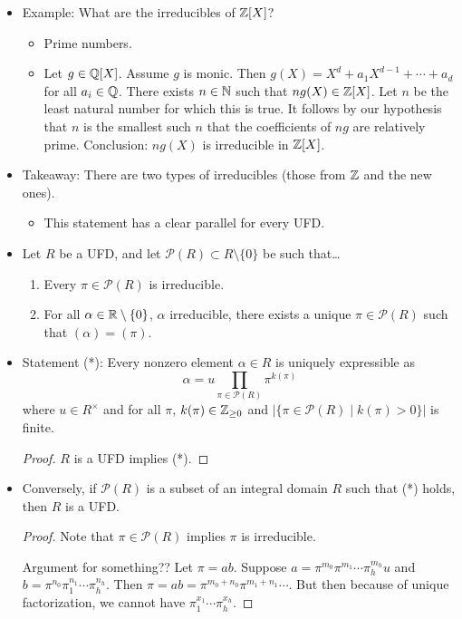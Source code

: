 \documentclass[../notes.tex]{subfiles}
\begin{document}
\begin{itemize}
\begin{itemize}
    \end{itemize}
    \item Example: What are the irreducibles of $\mathbb{Z}[X]$?
    \begin{itemize}
        \item Prime numbers.
        \item Let $g\in\mathbb{Q}[X]$. Assume $g$ is monic. Then $g(X)=X^d+a_1X^{d-1}+\cdots+a_d$ for all $a_i\in\mathbb{Q}$. There exists $n\in\mathbb{N}$ such that $ng(X)\in\mathbb{Z}[X]$. Let $n$ be the least natural number for which this is true. It follows by our hypothesis that $n$ is the smallest such $n$ that the coefficients of $ng$ are relatively prime. Conclusion: $ng(X)$ is irreducible in $\mathbb{Z}[X]$.
    \end{itemize}
    \item Takeaway: There are two types of irreducibles (those from $\mathbb{Z}$ and the new ones).
    \begin{itemize}
        \item This statement has a clear parallel for every UFD.
    \end{itemize}
    \item Let $R$ be a UFD, and let $\mathcal{P}(R)\subset R\setminus\{0\}$ be such that\dots
    \begin{enumerate}[label={(\roman*)}]
        \item Every $\pi\in\mathcal{P}(R)$ is irreducible.
        \item For all $\alpha\in\mathbb{R}\setminus\{0\}$, $\alpha$ irreducible, there exists a unique $\pi\in\mathcal{P}(R)$ such that $(\alpha)=(\pi)$.
    \end{enumerate}
    \item Statement (*): Every nonzero element $\alpha\in R$ is uniquely expressible as
    \begin{equation*}
        \alpha = u\prod_{\pi\in\mathcal{P}(R)}\pi^{k(\pi)}
    \end{equation*}
    where $u\in R^\times$ and for all $\pi$, $k(\pi)\in{\mathbb{Z}_{\geq 0}}$ and $|\{\pi\in\mathcal{P}(R)\mid k(\pi)>0\}|$ is finite.
    \begin{proof}
        $R$ is a UFD implies (*).
    \end{proof}
    \item Conversely, if $\mathcal{P}(R)$ is a subset of an integral domain $R$ such that (*) holds, then $R$ is a UFD.
    \begin{proof}
        Note that $\pi\in\mathcal{P}(R)$ implies $\pi$ is irreducible.\par
        Argument for something?? Let $\pi=ab$. Suppose $a=\pi^{m_0}\pi^{m_1}\cdots\pi_h^{m_h}u$ and $b=\pi^{n_0}\pi_1^{n_1}\cdots\pi_h^{n_h}$. Then $\pi=ab=\pi^{m_0+n_0}\pi^{m_1+n_1}\cdots$. But then because of unique factorization, we cannot have $\pi_1^{x_1}\cdots\pi_h^{x_h}$.

\end{proof}
\end{itemize}
\end{document}
